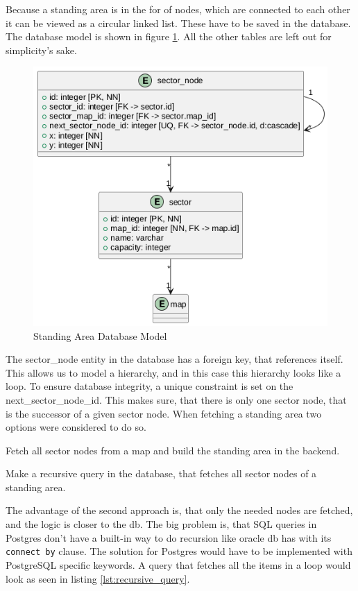 Because a standing area is in the for of nodes, which are connected to each other it can be viewed as a circular linked list. These have to be saved in the database. The database model is shown in figure \ref{fig:standing_area_db_model}. All the other tables are left out for simplicity's sake.

\begin{figure}
    \centering
    \includegraphics[scale=0.5]{pics/standing-area-db.png}
    \caption{Standing Area Database Model}
    \label{fig:standing_area_db_model}
\end{figure}

The sector\_node entity in the database has a foreign key, that references itself. This allows us to model a hierarchy, and in this case this hierarchy looks like a loop. To ensure database integrity, a unique constraint is set on the next\_sector\_node\_id. This makes sure, that there is only one sector node, that is the successor of a given sector node. When fetching a standing area two options were considered to do so.

\begin{compactenum}
\item Fetch all sector nodes from a map and build the standing area in the backend.
\item Make a recursive query in the database, that fetches all sector nodes of a standing area.
\end{compactenum}

The advantage of the second approach is, that only the needed nodes are fetched, and the logic is closer to the db. The big problem is, that SQL queries in Postgres don't have  a built-in way to do recursion like oracle db has with its \texttt{connect by} clause. The solution for Postgres would have to be implemented with PostgreSQL specific keywords. A query that fetches all the items in a loop would look as seen in listing \ref{lst:recursive_query}. 

